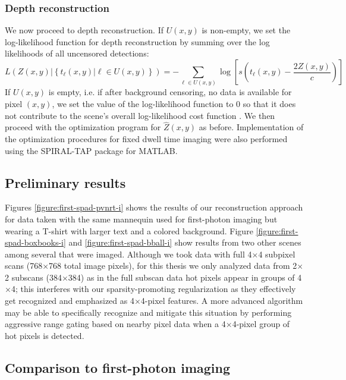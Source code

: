 \subsubsection{Depth reconstruction}
We now proceed to depth reconstruction. If $U(x,y)$ is non-empty, we set the log-likelihood function for depth reconstruction by summing over the log likelihoods of all uncensored detections:
\begin{equation}
L\left( Z(x,y) | \left\{t_\ell(x,y) | \ell \in U(x,y) \right\} \right) = - \sum_{\ell \in U(x,y)} \log\left[ s(t_\ell(x,y) - \frac{2Z(x,y)}{c}) \right]
\end{equation}
If $U(x,y)$ is empty, i.e. if after background censoring, no data is available for pixel $(x,y)$, we set the value of the log-likelihood function to $0$ so that it does not contribute to the scene's overall log-likelihood cost function \cite{kirmani-photon}. We then proceed with the optimization program for $\hat{Z}(x,y)$ as before. Implementation of the optimization procedures for fixed dwell time imaging were also performed using the SPIRAL-TAP package for MATLAB.

\subsection{Preliminary results}

Figures \ref{figure:first-spad-pvnrt-i} shows the results of our reconstruction approach for data taken with the same mannequin used for first-photon imaging but wearing a T-shirt with larger text and a colored background. Figure \ref{figure:first-spad-boxbooks-i} and \ref{figure:first-spad-bball-i} show results from two other scenes among several that were imaged. Although we took data with full 4$\times$4 subpixel scans (768$\times$768 total image pixels), for this thesis we only analyzed data from 2$\times$2 subscans (384$\times$384) as in the full subscan data hot pixels appear in groups of 4$\times$4; this interferes with our sparsity-promoting regularization as they effectively get recognized and emphasized as 4$\times$4-pixel features. A more advanced algorithm may be able to specifically recognize and mitigate this situation by performing aggressive range gating based on nearby pixel data when a 4$\times$4-pixel group of hot pixels is detected.

\subsection{Comparison to first-photon imaging}

